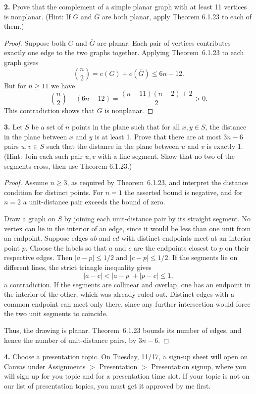 \documentclass[12pt]{amsart}
\theoremstyle{conjecture}
\theoremstyle{definition}
\theoremstyle{question}
\theoremstyle{theorem}
\begin{document}
    \noindent\textbf{2.} Prove that the complement of a simple planar graph with at least
    11 vertices is nonplanar.
    (Hint: If $G$ and $\overline{G}$ are both planar, apply Theorem 6.1.23 to each of them.)

    \begin{proof}
        Suppose both $G$ and $\overline G$ are planar. Each pair of
        vertices contributes exactly one edge to the two graphs together.
        Applying Theorem~6.1.23 to each graph gives
        \[
            \binom n2=e(G)+e(\overline G)\le 6n-12.
        \]
        But for $n\ge 11$ we have
        \[
            \binom n2-(6n-12)
            =\frac{(n-11)(n-2)+2}{2}>0.
        \]
        This contradiction shows that $\overline G$ is nonplanar.
    \end{proof}

    \noindent\textbf{3.} Let $S$ be a set of $n$ points in the plane such that for all $x,y\in S$,
    the distance in the plane between $x$ and $y$ is at least 1.
    Prove that there are at most $3n-6$ pairs $u,v\in S$ such that the distance in the plane
    between $u$ and $v$ is exactly 1.
    (Hint: Join each such pair $u,v$ with a line segment.
    Show that no two of the segments cross, then use Theorem 6.1.23.)

    \begin{proof}
        Assume $n\ge 3$, as required by Theorem~6.1.23, and interpret the
        distance condition for distinct points. For $n=1$ the asserted
        bound is negative, and for $n=2$ a unit-distance pair exceeds
        the bound of zero.

        Draw a graph on $S$ by joining each unit-distance pair by its
        straight segment. No vertex can lie in the interior of an edge,
        since it would be less than one unit from an endpoint.
        Suppose edges $ab$ and $cd$ with distinct endpoints meet at an
        interior point $p$. Choose the labels so that $a$ and $c$ are
        the endpoints closest to $p$ on their respective edges. Then
        $|a-p|\le 1/2$ and $|c-p|\le 1/2$. If the segments lie on
        different lines, the strict triangle inequality gives
        \[
            |a-c|<|a-p|+|p-c|\le 1,
        \]
        a contradiction. If the segments are collinear and overlap,
        one has an endpoint in the interior of the other, which was
        already ruled out. Distinct edges with a common endpoint can
        meet only there, since any further intersection would force
        the two unit segments to coincide.

        Thus, the drawing is planar. Theorem~6.1.23 bounds its number
        of edges, and hence the number of unit-distance pairs, by $3n-6$.
    \end{proof}

    \noindent\textbf{4.} Choose a presentation topic.
    On Tuesday, 11/17, a sign-up sheet will open on Canvas under Assignments $>$ Presentation
    $>$ Presentation signup, where you will sign up for you topic and for a presentation time
    slot.
    If your topic is not on our list of presentation topics, you must get it approved by me first.
\end{document}
